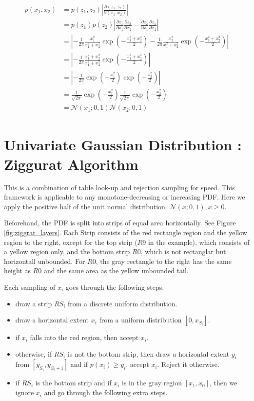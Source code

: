 \documentclass[a4]{article}
\begin{document}
\begin{equation}
\begin{aligned}
p(x_1, x_2) 
&= p(z_1, z_2)\left| \frac{\partial(z_1, z_2)}{\partial(x_1, x_2)} \right|\\
&= p(z_1)p(z_2)\left|
    \frac{\partial z_1}{\partial x_1}\frac{\partial z_2}{\partial x_2}
    - \frac{\partial z_2}{\partial x_1}\frac{\partial z_1}{\partial x_2}
\right|\\
&= \left|
-\frac{1}{2\pi}\frac{x_1^2}{x_1^2 + x_2^2}\exp\left( -\frac{x_1^2 + x_2^2}{2}\right)
-\frac{1}{2\pi}\frac{x_2^2}{x_1^2 + x_2^2}\exp\left( -\frac{x_1^2 + x_2^2}{2}\right)
\right|\\
&= \left|
-\frac{1}{2\pi}\frac{x_1^2+ x_2^2}{x_1^2 + x_2^2}\exp\left( -\frac{x_1^2 + x_2^2}{2}\right)
\right|\\
&= \left|
-\frac{1}{2\pi}\exp\left( -\frac{x_1^2}{2}\right)\exp\left( -\frac{x_2^2}{2}\right)
\right|\\
&=
\frac{1}{\sqrt{2\pi}}\exp\left( -\frac{x_1^2}{2}\right)
\frac{1}{\sqrt{2\pi}}\exp\left( -\frac{x_2^2}{2}\right)\\
&= \mathcal{N}(x_1;0,1)\mathcal{N}(x_2;0,1)\\
\end{aligned}
\end{equation}



\section{Univariate Gaussian Distribution : Ziggurat Algorithm}
This is a combination of table look-up and rejection sampling for speed.
This framework is applicable to any monotone-decreasing or increasing PDF.
Here we apply the positive half of the unit normal distribution. $\mathcal{N}(x;0,1), x \ge 0$.


Beforehand, the PDF is split into strips of equal area horizontally.
See Figure \ref{fig:ziggrat_layers}.
Each Strip consists of the red rectangle region and the yellow region to the right,
except for the top strip ($R9$ in the example), which consists of a yellow region only,
and the bottom strip $R0$, which is not rectanglar but horizontall unbounded.
For $R0$, the gray rectangle to the right has the same height as $R0$ and the same area as the
yellow unbounded tail.

Each sampling of $x_i$ goes through the following steps.
\begin{itemize}
\item draw a strip $RS_i$ from a discrete uniform distribution.
\item draw a horizontal extent $x_i$ from a uniform distribution $[0, x_{S_i}]$.
\item if $x_i$ falls into the red region, then accept $x_i$.
\item otherwise, if $RS_i$ is not the bottom strip, then draw a horizontal extent $y_i$ from 
$[y_{S_i}, y_{S_i+1}]$ and if $p(x_i) \ge y_i$, accept $x_i$. Reject it otherwise.
\item if $RS_i$ is the bottom strip and if $x_i$ is in the gray region $[x_1, x_0]$, then we
ignore $x_i$ and go through the following extra steps.
\end{itemize}
\end{document}
